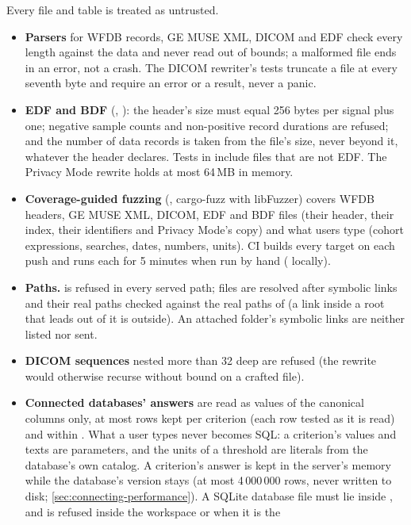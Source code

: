 Every file and table is treated as untrusted.
\begin{itemize}
\item \textbf{Parsers} for WFDB records, GE MUSE XML, DICOM and EDF check
  every length against the data and never read out of bounds; a malformed file ends in an error,
  not a crash. The DICOM rewriter's tests truncate a file at every seventh byte and require an
  error or a result, never a panic.
\item \textbf{EDF and BDF} (, ): the header's
  size must equal 256 bytes per signal plus one; negative sample counts and non-positive record
  durations are refused; and the number of data records is taken from the file's size, never
  beyond it, whatever the header declares. Tests in  include files
  that are not EDF. The Privacy Mode rewrite holds at most 64\,MB in memory.
\item \textbf{Coverage-guided fuzzing} (, cargo-fuzz with libFuzzer) covers
  WFDB headers, GE MUSE XML, DICOM, EDF and BDF files (their header,
  their index, their identifiers and Privacy Mode's copy) and what users type (cohort
  expressions, searches, dates, numbers, units). CI builds every target on each push and runs
  each for 5 minutes when run by hand ( locally).
\item \textbf{Paths.}  is refused in every served path; files are resolved after symbolic
  links and their real paths checked against the real paths of  (a link inside
  a root that leads out of it is outside). An attached folder's symbolic links are neither listed
  nor sent.
\item \textbf{DICOM sequences} nested more than 32 deep are refused (the rewrite would otherwise
  recurse without bound on a crafted file).
\item \textbf{Connected databases' answers} are read as values of the canonical columns only,
  at most  rows kept per criterion (each row tested as it is read) and within
  . What a user types never becomes SQL: a criterion's values and texts are
  parameters, and the units of a threshold are literals from the database's own catalog. A
  criterion's answer is kept in the server's memory while the database's version stays (at most
  4\,000\,000 rows, never written to disk; \cref{sec:connecting-performance}). A SQLite database file
  must lie inside , and is refused inside the workspace or when it is the

\end{itemize}
